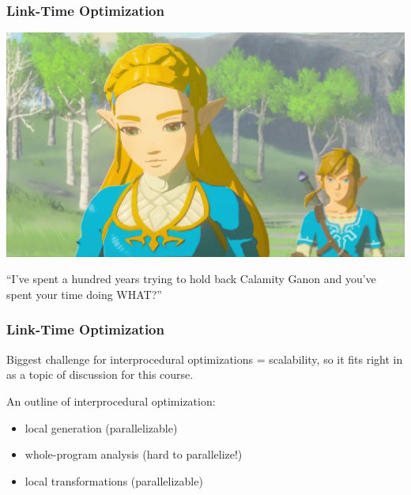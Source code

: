 \begin{frame}
\frametitle{Link-Time Optimization}

\begin{center}
	\includegraphics[width=\textwidth]{images/sadzelda.jpg}
\end{center}

``I've spent a hundred years trying to hold back Calamity Ganon and you've spent your time doing WHAT?''

\end{frame}


\begin{frame}
\frametitle{Link-Time Optimization}

\begin{changemargin}{1.5cm}
Biggest challenge for interprocedural optimizations = scalability, so 
it fits right in as a topic of discussion for this course.

An outline of interprocedural optimization:\\[-.5em]
\begin{itemize}
\item local generation (parallelizable)
\item whole-program analysis (hard to parallelize!)
\item local transformations (parallelizable)
\end{itemize}
\end{changemargin}
\end{frame}


